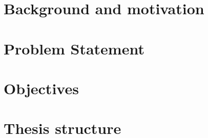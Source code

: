 
%
\section{Background and motivation}

\section{Problem Statement}
\section{Objectives}
\section{Thesis structure}


